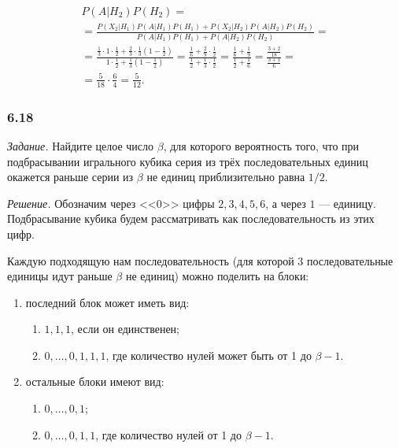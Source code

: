 \begin{enumerate}[label=\alph*)]
\begin{equation*}
\begin{split}
{P \left( \left. A \right| H_2 \right) P \left( H_2 \right) } = \\
= \frac{P \left( \left. X_2 \right| H_1 \right) P \left( \left. A \right| H_1 \right) P \left( H_1 \right) +
P \left( \left. X_2 \right| H_2 \right) P \left( \left. A \right| H_2 \right) P \left( H_2 \right)}{P \left( \left. A \right| H_1 \right) P \left( H_1 \right) +
P \left( \left. A \right| H_2 \right) P \left( H_2 \right) } = \\
= \frac{ \frac{1}{3} \cdot 1 \cdot \frac{1}{2} + \frac{2}{3} \cdot \frac{1}{3} \left( 1 - \frac{1}{2} \right) }{1 \cdot \frac{1}{2} +
\frac{1}{3} \left( 1 - \frac{1}{2} \right) } =
\frac{ \frac{1}{6} + \frac{2}{9} \cdot \frac{1}{2} }{ \frac{1}{2} + \frac{1}{3} \cdot \frac{1}{2} } =
\frac{ \frac{1}{6} + \frac{1}{9} }{ \frac{1}{2} + \frac{1}{6} } =
\frac{ \frac{3+2}{18} }{ \frac{3+1}{6} } = \\
= \frac{5}{18} \cdot \frac{6}{4} =
\frac{5}{12}.
\end{split}
\end{equation*}
\end{enumerate}

\subsubsection*{6.18}

\textit{Задание.} Найдите целое число $ \beta $, для которого вероятность того, что при подбрасывании игрального кубика серия из трёх последовательных единиц окажется раньше серии из $ \beta $ не единиц приблизительно равна $1/2$.

\textit{Решение.} Обозначим через <<0>> цифры $2, 3, 4, 5, 6$, а через $1$ --- единицу.
Подбрасывание кубика будем рассматривать как последовательность из этих цифр.

Каждую подходящую нам последовательность (для которой 3 последовательные единицы идут раньше $ \beta $ не единиц) можно поделить на блоки:
\begin{enumerate}
\item последний блок может иметь вид:
\begin{enumerate}[label=\alph*)]
\item $1, 1, 1$, если он единственен;
\item $0, \dotsc, 0, 1, 1, 1$, где количество нулей может быть от 1 до $ \beta - 1$.
\end{enumerate}
\item остальные блоки имеют вид:
\begin{enumerate}[label=\alph*)]
\item $0, \dotsc, 0, 1$;
\item $0, \dotsc, 0, 1, 1$, где количество нулей от 1 до $ \beta - 1$.
\end{enumerate}
\end{enumerate}

